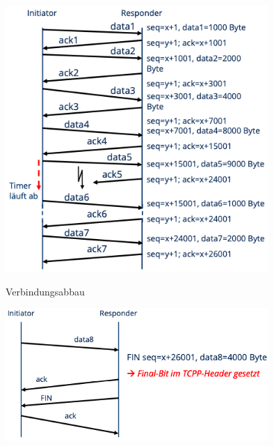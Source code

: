 \documentclass{article}
\begin{document}
\begin{enumerate}[label=(\alph*)]
\begin{center}
			\includegraphics[width=0.75\textwidth]{./pics/TCPP-Datentransfer}
		\end{center}
		Verbindungsabbau
		\begin{center}
			\includegraphics[width=0.75\textwidth]{./pics/TCPP-Verbindungsabbau}
		\end{center}
	\end{enumerate}
\end{document}
